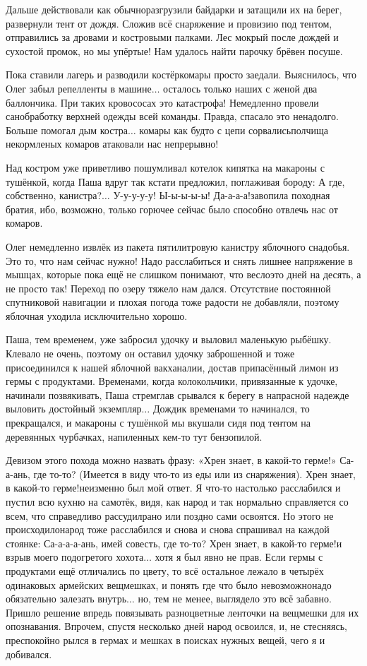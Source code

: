 Дальше действовали как обычно\mdash разгрузили байдарки и затащили их на берег, развернули тент от дождя. Сложив всё снаряжение и провизию под тентом, отправились за дровами и костровыми палками. Лес мокрый после дождей и сухостой промок, но мы упёртые! Нам удалось найти парочку брёвен посуше. 

Пока ставили лагерь и разводили костёр\mdash комары просто заедали. Выяснилось, что Олег забыл репелленты в машине$\ldots$ осталось только наших с женой два баллончика. При таких кровососах это катастрофа! Немедленно провели санобработку верхней одежды всей команды. Правда, спасало это ненадолго. Больше помогал дым костра$\ldots$ комары как будто с цепи сорвались\mdash полчища некормленых комаров атаковали нас непрерывно!

Над костром уже приветливо пошумливал котелок кипятка на макароны с тушёнкой, когда Паша вдруг так кстати предложил, поглаживая бороду: 
\mdash А где, собственно, канистра?$\ldots$
\mdash У-у-у-у-у! Ы-ы-ы-ы-ы! Да-а-а-а!\mdash завопила походная братия, ибо, возможно, только горючее сейчас было способно отвлечь нас от комаров. 

Олег немедленно извлёк из пакета пятилитровую канистру яблочного снадобья. Это то, что нам сейчас нужно! Надо расслабиться и снять лишнее напряжение в мышцах, которые пока ещё не слишком понимают, что весло\mdash это дней на десять, а не просто так! Переход по озеру тяжело нам дался. Отсутствие постоянной спутниковой навигации и плохая погода тоже радости не добавляли, поэтому яблочная уходила исключительно хорошо.

Паша, тем временем, уже забросил удочку и выловил маленькую рыбёшку. Клевало не очень, поэтому он оставил удочку заброшенной и тоже присоединился к нашей яблочной вакханалии, достав припасённый лимон из гермы с продуктами. Временами, когда колокольчики, привязанные к удочке, начинали позвякивать, Паша стремглав срывался к берегу в напрасной надежде выловить достойный экземпляр$\ldots$ Дождик временами то начинался, то прекращался, и макароны с тушёнкой мы вкушали сидя под тентом на деревянных чурбачках, напиленных кем-то тут бензопилой. 

Девизом этого похода можно назвать фразу: «Хрен знает, в какой-то герме!»
\mdash Са-а-ань, где то-то? (Имеется в виду что-то из еды или из снаряжения). 
\mdash Хрен знает, в какой-то герме!\mdash неизменно был мой ответ. 
Я что-то настолько расслабился и пустил всю кухню на самотёк, видя, как народ и так нормально справляется со всем, что справедливо рассудил\mdash рано или поздно сами освоятся. Но этого не происходило\mdash народ тоже расслабился и снова и снова спрашивал на каждой стоянке: 
\mdash Са-а-а-а-ань, имей совесть, где то-то? 
\mdash Хрен знает, в какой-то герме!\mdash и взрыв моего подогретого хохота$\ldots$ хотя я был явно не прав. Если гермы с продуктами ещё отличались по цвету, то всё остальное лежало в четырёх одинаковых армейских вещмешках, и понять где что было невозможно\mdash надо обязательно залезать внутрь$\ldots$ но, тем не менее, выглядело это всё забавно. Пришло решение впредь повязывать разноцветные ленточки на вещмешки для их опознавания. Впрочем, спустя несколько дней народ освоился, и, не стесняясь, преспокойно рылся в гермах и мешках в поисках нужных вещей, чего я и добивался.

